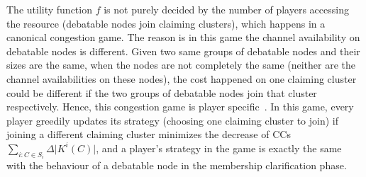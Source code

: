 \documentclass[10pt,journal,compsoc]{IEEEtran}
\theoremstyle{mytheoremstyle}
\theoremstyle{mytheoremstyle}
\theoremstyle{mytheoremstyle}
\begin{document}
\begin{itemize}
The utility function $f$ is not purely decided by the number of players accessing the resource (debatable nodes join claiming clusters), which happens in a canonical congestion game.
The reason is in this game the channel availability on debatable nodes is different.
Given two same groups of debatable nodes and their sizes are the same, when the nodes are not completely the same (neither are the channel availabilities on these nodes), the cost happened on one claiming cluster could be different if the two groups of debatable nodes join that cluster respectively.
Hence, this congestion game is player specific~\cite{Ackermann06purenash}.
In this game, every player greedily updates its strategy (choosing one claiming cluster to join) if joining a different claiming cluster minimizes the decrease of CCs $\sum_{i:C\in S_i} \Delta\vert K^i(C) \vert$, and a player's strategy in the game is exactly the same with the behaviour of a debatable node in the membership clarification phase.




\end{itemize}

\end{document}
